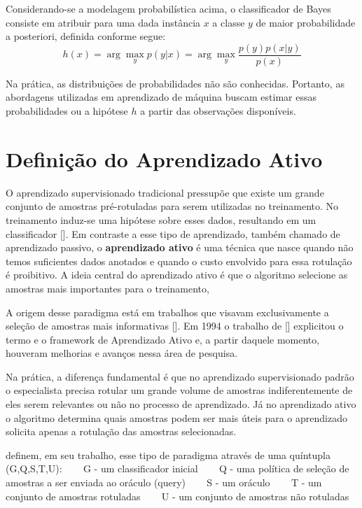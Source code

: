 {Considerando-se a modelagem probabilística acima, o classificador de Bayes consiste em atribuir para uma dada instância $x$ a classe $y$ de maior probabilidade a posteriori, definida conforme segue:
\begin{equation}
  h(x) = \arg\max_y p(y|x) = \arg\max_y \frac{p(y) p(x|y)}{p(x)}
\end{equation}

Na prática, as distribuições de probabilidades não são conhecidas. Portanto, as abordagens utilizadas em aprendizado de máquina buscam estimar essas probabilidades ou a hipótese $h$ a partir das observações disponíveis.
}

\section{Definição do Aprendizado Ativo}
\label{sec:definicao}

O aprendizado supervisionado tradicional pressupõe que existe um grande conjunto de amostras pré-rotuladas para serem utilizadas no treinamento. No treinamento induz-se uma hipótese sobre esses dados, resultando em um classificador [\cite{settles2014active}]. Em contraste a esse tipo de aprendizado, também chamado de aprendizado passivo, o {\bf aprendizado ativo} é uma técnica que nasce quando não temos suficientes dados anotados e quando o custo envolvido para essa rotulação é proibitivo. A ideia central do aprendizado ativo é que o algoritmo selecione as amostras mais importantes para o treinamento,  


A origem desse paradigma está em trabalhos que visavam exclusivamente a seleção de amostras mais informativas  [\cite{angluin1988queries, baum1992query, atlas1990training}]. Em 1994 o trabalho de [\cite{cohn1994improving}] explicitou o termo e o framework de Aprendizado Ativo e, a partir daquele momento, houveram melhorias e avanços nessa área de pesquisa. 


Na prática, a diferença fundamental é que no aprendizado supervisionado padrão o especialista precisa rotular um grande volume de amostras indiferentemente de eles serem relevantes ou não no processo de aprendizado. Já no aprendizado ativo o algoritmo determina quais amostras podem ser mais úteis para o aprendizado  solicita apenas a rotulação das amostras selecionadas. 

\cite{persello2012active} definem, em seu trabalho, esse tipo de paradigma através de uma quíntupla (G,Q,S,T,U):
\newline
\newline
~~~ G - um classificador inicial 
\newline
~~~ Q - uma política de seleção de amostras a ser enviada ao oráculo (query)
\newline 
~~~ S - um oráculo
\newline 
~~~ T - um conjunto de amostras rotuladas
\newline 
~~~ U - um conjunto de amostras não rotuladas


